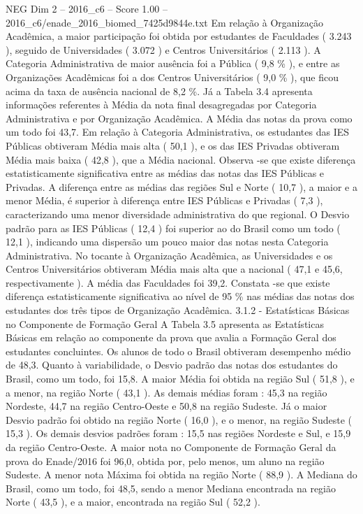 \begin{textsample}{NEG Dim 2 – 2016\_c6 – Score 1.00 – 2016\_c6/enade\_2016\_biomed\_7425d9844e.txt}
Em relação à Organização Acadêmica, a maior participação foi obtida por estudantes de Faculdades ( 3.243 ), seguido de Universidades ( 3.072 ) e Centros Universitários ( 2.113 ).
A Categoria Administrativa de maior ausência foi a Pública ( 9,8 \% ), e entre as Organizações Acadêmicas foi a dos Centros Universitários ( 9,0 \% ), que ficou acima da taxa de ausência nacional de 8,2 \%.
Já a Tabela 3.4 apresenta informações referentes à Média da nota final desagregadas por Categoria Administrativa e por Organização Acadêmica.
A Média das notas da prova como um todo foi 43,7.
Em relação à Categoria Administrativa, os estudantes das IES Públicas obtiveram Média mais alta ( 50,1 ), e os das IES Privadas obtiveram Média mais baixa ( 42,8 ), que a Média nacional.
Observa -se que existe diferença estatisticamente significativa entre as médias das notas das IES Públicas e Privadas.
A diferença entre as médias das regiões Sul e Norte ( 10,7 ), a maior e a menor Média, é superior à diferença entre IES Públicas e Privadas ( 7,3 ), caracterizando uma menor diversidade administrativa do que regional.
O Desvio padrão para as IES Públicas ( 12,4 ) foi superior ao do Brasil como um todo ( 12,1 ), indicando uma dispersão um pouco maior das notas nesta Categoria Administrativa.
No tocante à Organização Acadêmica, as Universidades e os Centros Universitários obtiveram Média mais alta que a nacional ( 47,1 e 45,6, respectivamente ).
A média das Faculdades foi 39,2.
Constata -se que existe diferença estatisticamente significativa ao nível de 95 \% nas médias das notas dos estudantes dos três tipos de Organização Acadêmica. 3.1.2 - Estatísticas Básicas no Componente de Formação Geral A Tabela 3.5 apresenta as Estatísticas Básicas em relação ao componente da prova que avalia a Formação Geral dos estudantes concluintes.
Os alunos de todo o Brasil obtiveram desempenho médio de 48,3.
Quanto à variabilidade, o Desvio padrão das notas dos estudantes do Brasil, como um todo, foi 15,8.
A maior Média foi obtida na região Sul ( 51,8 ), e a menor, na região Norte ( 43,1 ).
As demais médias foram : 45,3 na região Nordeste, 44,7 na região Centro-Oeste e 50,8 na região Sudeste.
Já o maior Desvio padrão foi obtido na região Norte ( 16,0 ), e o menor, na região Sudeste ( 15,3 ).
Os demais desvios padrões foram : 15,5 nas regiões Nordeste e Sul, e 15,9 da região Centro-Oeste.
A maior nota no Componente de Formação Geral da prova do Enade/2016 foi 96,0, obtida por, pelo menos, um aluno na região Sudeste.
A menor nota Máxima foi obtida na região Norte ( 88,9 ).
A Mediana do Brasil, como um todo, foi 48,5, sendo a menor Mediana encontrada na região Norte ( 43,5 ), e a maior, encontrada na região Sul ( 52,2 ).

\end{textsample}
